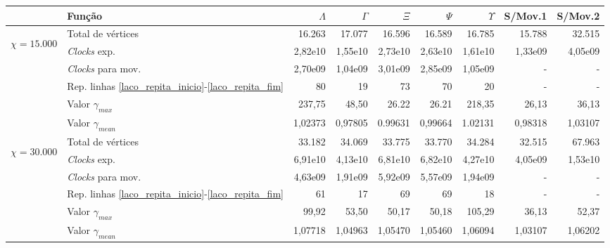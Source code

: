 \begin{table}
\begin{center}
\begin{tabular}{|c|l|r|r|r|r|r|r|r|} %
\hline
& Função & $\Lambda$ & $\Gamma$ & $\Xi$ & $\Psi$ & $\Upsilon$ & S/Mov.1 & S/Mov.2 \\
\hline %
\multirow{5}{*}{\begin{sideways}$\chi = 15.000$\end{sideways} } 
& Total de vértices                                                     & 16.263 & 17.077 & 16.596 & 16.589 & 16.785 & 15.788 & 32.515 \\
& {\it Clocks} exp.	                                             	& 2,82e10 & 1,55e10 & 2,73e10 & 2,63e10 & 1,61e10 & 1,33e09 & 4,05e09\\
& {\it Clocks} para mov.                                      		& 2,70e09 & 1,04e09 &3,01e09  & 2,85e09 & 1,05e09 & - & - \\
& Rep. linhas \ref{laco_repita_inicio}-\ref{laco_repita_fim} 		& 80 & 19 & 73 & 70 & 20 & - & - \\
& Valor $\gamma_{max}$							& 237,75 & 48,50 & 26.22 & 26.21 & 218,35 & 26,13 & 36,13 \\
& Valor $\gamma_{mean}$							& 1,02373 & 0,97805 & 0.99631 & 0,99664 & 1.02131 & 0,98318 & 1,03107 \\
\hline %
\multirow{5}{*}{\begin{sideways}$\chi = 30.000$\end{sideways} } 
& Total de vértices                                                     & 33.182 & 34.069 & 33.775 & 33.770 & 34.284 & 32.515 & 67.963 \\
& {\it Clocks} exp.	                                             	& 6,91e10 & 4,13e10 & 6,81e10 & 6,82e10 & 4,27e10 & 4,05e09 & 1,53e10 \\
& {\it Clocks} para mov.                                      		& 4,63e09 & 1,91e09 & 5,92e09 & 5,57e09 & 1,94e09 & - & - \\
& Rep. linhas \ref{laco_repita_inicio}-\ref{laco_repita_fim} 		& 61 & 17 & 69 & 69 & 18 & - & - \\
& Valor $\gamma_{max}$							& 99,92 & 53,50 & 50,17 & 50,18 & 105,29 & 36,13 & 52,37 \\
& Valor $\gamma_{mean}$							& 1,07718 & 1,04963 & 1,05470 & 1,05460 & 1,06094 & 1,03107 & 1,06202 \\

\end{tabular}
\end{center}
\end{table}
